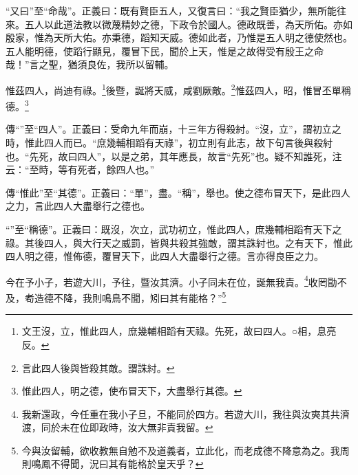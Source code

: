 {\noindent\shu{}\fzkt “又曰”至“命哉”。正義曰：既有賢臣五人，又復言曰：“我之賢臣猶少，無所能往來。五人以此道法教以微蔑精妙之德，下政令於國人。德政既善，為天所佑。亦如殷家，惟為天所大佑。亦秉德，蹈知天威。德如此者，乃惟是五人明之德使然也。五人能明德，使蹈行顯見，覆冒下民，聞於上天，惟是之故得受有殷王之命哉！”言之聖，猶須良佐，我所以留輔。 \par}

惟茲四人，尚迪有祿。\footnote{文王沒，立，惟此四人，庶幾輔相蹈有天祿。先死，故曰四人。○相，息亮反。}後暨，誕將天威，咸劉厥敵。\footnote{言此四人後與皆殺其敵。謂誅紂。}惟茲四人，昭，惟冒丕單稱德。\footnote{惟此四人，明之德，使布冒天下，大盡舉行其德。}


{\noindent\zhuan{}\fzbyks 傳“”至“四人”。正義曰：受命九年而崩，十三年方得殺紂。“沒，立”，謂初立之時，惟此四人而已。“庶幾輔相蹈有天祿”，初立則有此志，故下句言後與殺紂也。“先死，故曰四人”，以是之弟，其年應長，故言“先死”也。疑不知誰死，注云：“至時，等有死者，餘四人也。” \par}

{\noindent\zhuan{}\fzbyks 傳“惟此”至“其德”。正義曰：“單”，盡。“稱”，舉也。使之德布冒天下，是此四人之力，言此四人大盡舉行之德也。 \par}

{\noindent\shu{}\fzkt “”至“稱德”。正義曰：既沒，次立，武功初立，惟此四人，庶幾輔相蹈有天下之祿。其後四人，與大行天之威罰，皆與共殺其強敵，謂其誅紂也。之有天下，惟此四人明之德，惟佈德，覆冒天下，此四人大盡舉行之德。言亦得良臣之力。 \par}

今在予小子，若遊大川，予往，暨汝其濟。小子同未在位，誕無我責。\footnote{我新還政，今任重在我小子旦，不能同於四方。若遊大川，我往與汝奭其共濟渡，同於未在位即政時，汝大無非責我留。}收罔勖不及，耇造德不降，我則鳴鳥不聞，矧曰其有能格？”\footnote{今與汝留輔，欲收教無自勉不及道義者，立此化，而老成德不降意為之。我周則鳴鳳不得聞，況曰其有能格於皇天乎？}


